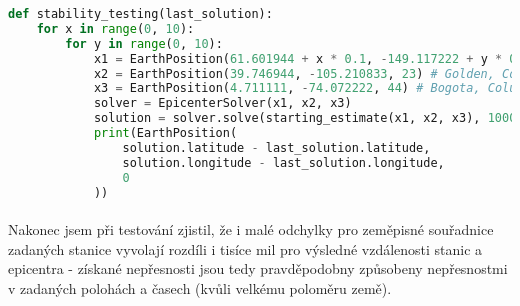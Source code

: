 \documentclass{article}
\begin{document}
    \begin{lstlisting}[language=Python]
def stability_testing(last_solution):
    for x in range(0, 10):
        for y in range(0, 10):
            x1 = EarthPosition(61.601944 + x * 0.1, -149.117222 + y * 0.1, 7.5) # Palmer, Alaska
            x2 = EarthPosition(39.746944, -105.210833, 23) # Golden, Colorado
            x3 = EarthPosition(4.711111, -74.072222, 44) # Bogota, Columbia
            solver = EpicenterSolver(x1, x2, x3)
            solution = solver.solve(starting_estimate(x1, x2, x3), 1000)
            print(EarthPosition(
                solution.latitude - last_solution.latitude,
                solution.longitude - last_solution.longitude,
                0
            ))\end{lstlisting}

    \paragraph{} Nakonec jsem při testování zjistil, že i malé odchylky pro 
    zeměpisné souřadnice zadaných stanice vyvolají rozdíli i tisíce mil pro výsledné vzdálenosti 
    stanic a epicentra - získané nepřesnosti jsou tedy pravděpodobny způsobeny nepřesnostmi 
    v zadaných polohách a časech (kvůli velkému poloměru země).
\end{document}
